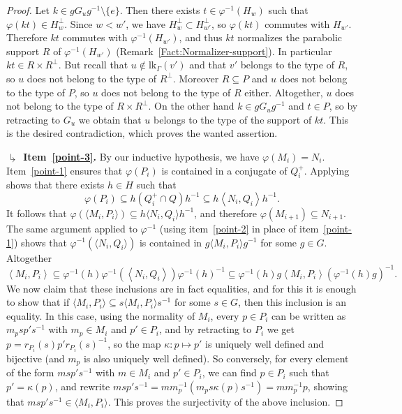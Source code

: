 \documentclass[a4paper,english,11pt]{article}
\theoremstyle{definition}
\theoremstyle{remark}
\newcommand{\lk}{\mathrm{lk}}
\begin{document}
\begin{proof}
Let $k\in gG_ug^{-1}\setminus\{e\}$. Then there exists $t\in\varphi^{-1}(H_w)$ such that $\varphi(kt)\in H_w^{\perp}$. Since $w<w'$, we have $H_w^\perp\subset H_{w'}^\perp$, so $\varphi(kt)$ commutes with $H_{w'}$. Therefore $kt$ commutes with $\varphi^{-1}(H_{w'})$, and thus $kt$ normalizes the parabolic support $R$ of $\varphi^{-1}(H_{w'})$ (Remark~\ref{Fact:Normalizer-support}). In particular $kt\in R\times R^\perp$. But recall that $u\notin \lk_\Gamma(v')$ and that $v'$ belongs to the type of $R$, so $u$ does not belong to the type of $R^\perp$. Moreover $R\subseteq P$ and $u$ does not belong to the type of $P$, so $u$ does not belong to the type of $R$ either. Altogether, $u$ does not belong to the type of $R\times R^{\perp}$. On the other hand $k\in gG_ug^{-1}$ and $t\in P$, so by retracting to $G_u$ we obtain that $u$ belongs to the type of the support of $kt$. This is the desired contradiction, which proves the wanted assertion. 

\smallskip

\textbf{$\drsh$ Item~\ref{point-3}.}  
By our inductive hypothesis, we have $\varphi(M_i)=N_i$. Item~\ref{point-1} ensures that $\varphi(P_i)$ is contained in a conjugate of $Q^+_i$. Applying \cite[Proposition 3.4]{AM} shows that there exists $h\in H$ such that
\begin{equation*}
    \varphi\left(P_i\right)\subseteq h\left(Q_i^+\cap Q\right)h^{-1}\subseteq h\left\langle{N_i,Q_i}\right\rangle h^{-1}.
\end{equation*}
It follows that $\varphi(\langle M_i,P_i\rangle)\subseteq h \langle N_i,Q_i\rangle h^{-1}$, and therefore $\varphi(M_{i+1})\subseteq N_{i+1}$. The same argument applied to $\varphi^{-1}$ (using item~\ref{point-2} in place of item~\ref{point-1}) shows that $\varphi^{-1}(\langle N_i,Q_i\rangle)$ is contained in $g\langle M_i,P_i\rangle g^{-1}$ for some $g\in G$. Altogether
\begin{equation*}
    \left\langle {M_i,P_i}\right\rangle
    \subseteq \varphi^{-1}(h)\varphi^{-1}\left(\left\langle N_i,Q_i\right\rangle\right)\varphi^{-1}(h)^{-1}\subseteq \varphi^{-1}(h)g \left\langle M_i,P_i\right\rangle (\varphi^{-1}(h)g)^{-1}.
\end{equation*}
We now claim that these inclusions are in fact equalities, and for this it is enough to show that if $\langle M_i,P_i\rangle\subseteq s\langle M_i,P_i\rangle s^{-1}$ for some $s\in G$, then this inclusion is an equality. In this case, using the normality of $M_i$, every $p\in P_i$ can be written as $m_psp's^{-1}$ with $m_p\in M_i$ and $p'\in P_i$, and by retracting to $P_i$ we get $p=r_{P_i}(s)p'r_{P_i}(s)^{-1}$, so the map $\kappa:p\mapsto p'$ is uniquely well defined and bijective (and $m_p$ is also uniquely well defined). So conversely, for every element of the form $msp's^{-1}$ with $m\in M_i$ and $p'\in P_i$, we can find $p\in P_i$ such that $p'=\kappa(p)$, and rewrite $msp's^{-1}=mm_p^{-1}(m_ps\kappa(p)s^{-1})=mm_p^{-1}p$, showing that $msp's^{-1}\in \langle M_i,P_i\rangle$. This proves the surjectivity of the above inclusion.


\end{proof}
\end{document}
